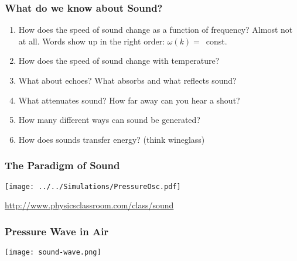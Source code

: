 \documentclass[pdf, handout, hideothersubsections]{beamer}
\begin{document}
\begin{frame}
\frametitle{What do we know about Sound?}
\begin{enumerate}
\item How does the speed of sound change as a function of frequency?
\pause Almost not at all. Words show up in the right order: $\omega(k)
=$~const.
\pause
\item How does the speed of sound change with temperature?
\pause
\item What about echoes? What absorbs and what reflects sound?
\pause
\item What attenuates sound? How far away can you hear a shout?
\pause
\item How many different ways can sound be generated?
\pause
\item How does sounds transfer energy? (think wineglass)

\end{enumerate}
\end{frame}


\begin{frame}
\frametitle{The Paradigm of Sound}
\centering
\texttt{[image: ../../Simulations/PressureOsc.pdf]}

\url{http://www.physicsclassroom.com/class/sound}
\end{frame}

\begin{frame}
\frametitle{Pressure Wave in Air}

\centering
\texttt{[image: sound-wave.png]}

\end{frame}
\end{document}
